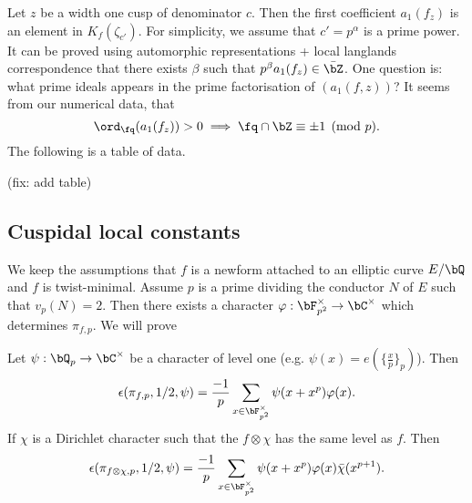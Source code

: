 \documentclass [11pt, proquest] {uwthesis}[2015/03/03]
\begin{document}

Let $z$ be a width one cusp of denominator $c$. Then the first coefficient $a_1(f_z)$ is an element in $K_f(\zeta_{c'})$. For simplicity, we assume that $c' = p^{\alpha}$ is a prime power. It can be proved using automorphic representations + local langlands correspondence that there exists $\beta$ such that $p^\beta a_1(f_z) \in \bar{\bZ}$.  One question is: what prime ideals appears in the prime factorisation of $(a_1(f,z))$?  It seems from our numerical data, that
\[
	\ord_\fq(a_1(f_z)) > 0 \implies \fq \cap \bZ \equiv \pm 1 \pmod {p}.
\]
The following is a table of data. 

(fix: add table)

\subsection{Cuspidal local constants}

We keep the assumptions that $f$ is a newform attached to an elliptic curve $E/\bQ$ and $f$ is twist-minimal. Assume 
$p$ is a prime dividing the conductor $N$ of $E$ such that $v_p(N) = 2$. Then there exists a character 
$\varphi: \bF_{p^2}^{\times} \to \bC^{\times}$ which determines $\pi_{f,p}$. We will prove 

\begin{Lemma} \label{cuspidal constant}
Let $\psi: \bQ_p \to \bC^{\times}$ be a character of level one (e.g. $\psi(x) = e(\{\frac{x}{p}\}_p)$). Then
\[
	\epsilon(\pi_{f,p}, 1/2, \psi)  = \frac{-1}{p} \sum_{x \in \bF_{p^2}^{\times}} \psi( x + x^p) \varphi(x). 
\]
If $\chi$ is a Dirichlet character such that the $f\otimes \chi$ has the same level as $f$. Then 
\[
	\epsilon(\pi_{f \otimes \chi,p}, 1/2, \psi)  = \frac{-1}{p} \sum_{x \in \bF_{p^2}^{\times}} \psi( x + x^p) \varphi(x) \bar{\chi}(x^{p+1}). 
\]
\end{Lemma}
\end{document}
